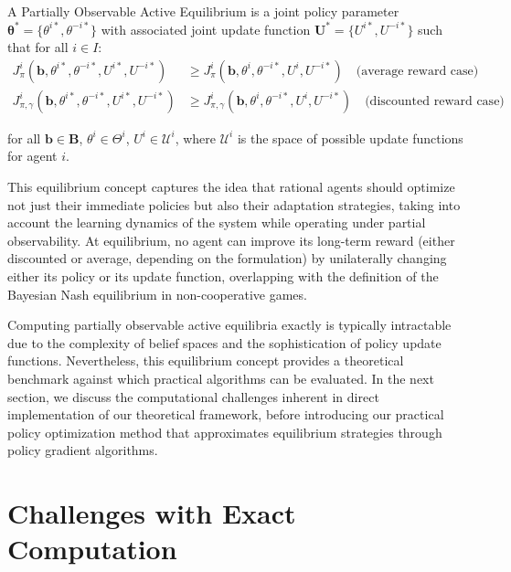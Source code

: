 \begin{definition}
    A Partially Observable Active Equilibrium is a joint policy parameter $\boldsymbol{\theta}^* = \{\theta^{i*}, \theta^{-i*}\}$ with associated joint update function $\boldsymbol{U}^* = \{U^{i*}, U^{-i*}\}$ such that for all $i \in I$:
    \begin{align}
        J^i_{\pi}(\boldsymbol{b}, \theta^{i*}, \theta^{-i*}, U^{i*}, U^{-i*}) &\geq J^i_{\pi}(\boldsymbol{b}, \theta^i, \theta^{-i*}, U^i, U^{-i*}) \quad \text{(average reward case)} \\
        J^i_{\pi, \gamma}(\boldsymbol{b}, \theta^{i*}, \theta^{-i*}, U^{i*}, U^{-i*}) &\geq J^{i}_{\pi, \gamma}(\boldsymbol{b}, \theta^i, \theta^{-i*}, U^i, U^{-i*}) \quad \text{(discounted reward case)} 
    \end{align}
    
    for all $\boldsymbol{b} \in \boldsymbol{B}$, $\theta^i \in \Theta^i$, $U^i \in \mathcal{U}^i$, where $\mathcal{U}^i$ is the space of possible update functions for agent $i$.
\end{definition}

This equilibrium concept captures the idea that rational agents should optimize not just their immediate policies but also their adaptation strategies, taking into account the learning dynamics of the system while operating under partial observability. At equilibrium, no agent can improve its long-term reward (either discounted or average, depending on the formulation) by unilaterally changing either its policy or its update function, overlapping with the definition of the Bayesian Nash equilibrium in non-cooperative games.

Computing partially observable active equilibria exactly is typically intractable due to the complexity of belief spaces and the sophistication of policy update functions. Nevertheless, this equilibrium concept provides a theoretical benchmark against which practical algorithms can be evaluated. In the next section, we discuss the computational challenges inherent in direct implementation of our theoretical framework, before introducing our practical policy optimization method that approximates equilibrium strategies through policy gradient algorithms.

\section{Challenges with Exact Computation}

